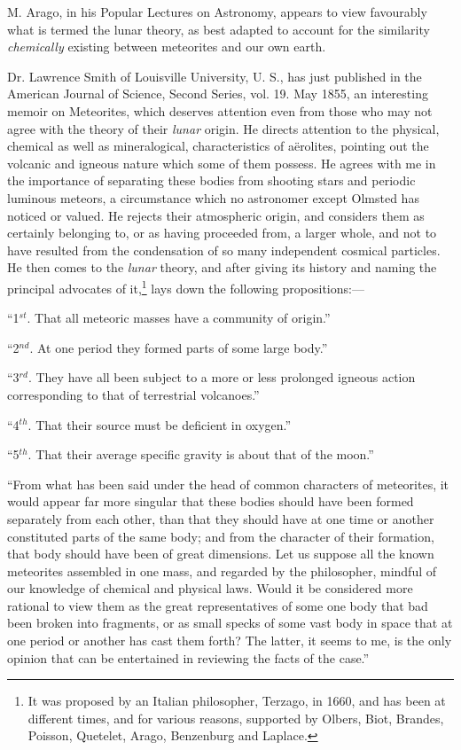 \documentclass[a4paper, 12pt, oneside]{article}
\begin{document}
M. Arago, in his Popular Lectures on Astronomy, appears to view favourably what is termed the lunar theory, as best adapted to account for the similarity \emph{chemically} existing between meteorites and our own earth.

Dr. Lawrence Smith of Louisville University, U. S., has just published in the American Journal of Science, Second Series, vol. 19. May 1855, an interesting memoir on Meteorites, which deserves attention even from those who may not agree with the theory of their \emph{lunar} origin. He directs attention to the physical, chemical as well as mineralogical, characteristics of aërolites, pointing out the volcanic and igneous nature which some of them possess. He agrees with me in the importance of separating these bodies from shooting stars and periodic luminous meteors, a circumstance which no astronomer except Olmsted has noticed or valued. He rejects their atmospheric origin, and considers them as certainly belonging to, or as having proceeded from, a larger whole, and not to have resulted from the condensation of so many independent cosmical particles. He then comes to the \emph{lunar} theory, and after giving its history and naming the principal advocates of it,\footnote{It was proposed by an Italian philosopher, Terzago, in 1660, and has been at different times, and for various reasons, supported by Olbers, Biot, Brandes, Poisson, Quetelet, Arago, Benzenburg and Laplace.} lays down the following propositions:---

``1$^{st}$. That all meteoric masses have a community of origin.''

``2$^{nd}$. At one period they formed parts of some large body.''

``3$^{rd}$. They have all been subject to a more or less prolonged igneous action corresponding to that of terrestrial volcanoes.''

``4$^{th}$. That their source must be deficient in oxygen.''

``5$^{th}$. That their average specific gravity is about that of the moon.''

``From what has been said under the head of common characters of meteorites, it would appear far more singular that these bodies should have been formed separately from each other, than that they should have at one time or another constituted parts of the same body; and from the character of their formation, that body should have been of great dimensions. Let us suppose all the known meteorites assembled in one mass, and regarded by the philosopher, mindful of our knowledge of chemical and physical laws. Would it be considered more rational to view them as the great representatives of some one body that bad been broken into fragments, or as small specks of some vast body in space that at one period or another has cast them forth? The latter, it seems to me, is the only opinion that can be entertained in reviewing the facts of the case.''
\end{document}
